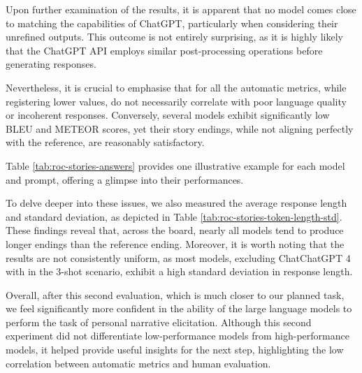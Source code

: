 Upon further examination of the results, it is apparent that no model comes close to matching the capabilities of ChatGPT, particularly when considering their unrefined outputs. This outcome is not entirely surprising, as it is highly likely that the ChatGPT API employs similar post-processing operations before generating responses.

Nevertheless, it is crucial to emphasise that for all the automatic metrics, while registering lower values, do not necessarily correlate with poor language quality or incoherent responses. Conversely, several models exhibit significantly low BLEU and METEOR scores, yet their story endings, while not aligning perfectly with the reference, are reasonably satisfactory.

Table \ref{tab:roc-stories-answers} provides one illustrative example for each model and prompt, offering a glimpse into their performances. 

% 
To delve deeper into these issues, we also measured the average response length and standard deviation, as depicted in Table \ref{tab:roc-stories-token-length-std}. These findings reveal that, across the board, nearly all models tend to produce longer endings than the reference ending. Moreover, it is worth noting that the results are not consistently uniform, as most models, excluding ChatChatGPT 4 with in the 3-shot scenario, exhibit a high standard deviation in response length.

Overall, after this second evaluation, which is much closer to our planned task, we feel significantly more confident in the ability of the large language models to perform the task of personal narrative elicitation. Although this second experiment did not differentiate low-performance models from high-performance models, it helped provide useful insights for the next step, highlighting the low correlation between automatic metrics and human evaluation.

